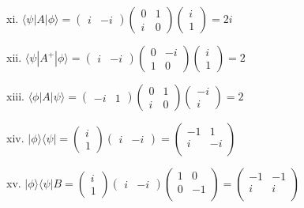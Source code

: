 \documentclass[12pt]{article}
\begin{document}
\begin{spacing}{2.0}
xi. $\langle \psi|A|\phi \rangle= \left(
\begin{array}{cc}
i & -i
\end{array}
\right)\left(
\begin{array}{cc}
0 & 1\\
i & 0
\end{array}
\right)\left(
\begin{array}{c}
i\\
1
\end{array}
\right)=2i$

xii. $\langle \psi|A^{+}|\phi \rangle=\left(
\begin{array}{cc}
i & -i
\end{array}
\right)\left(
\begin{array}{cc}
0 & -i\\
1 & 0
\end{array}
\right)\left(
\begin{array}{c}
i\\
1
\end{array}
\right)=2$

xiii. $\langle \phi|A|\psi \rangle=\left(
\begin{array}{cc}
-i & 1
\end{array}
\right)\left(
\begin{array}{cc}
0 & 1\\
i & 0
\end{array}
\right)\left(
\begin{array}{c}
-i\\
i
\end{array}
\right)=2$

xiv. $|\phi\rangle \langle \psi|= \left(
\begin{array}{c}
i\\
1
\end{array}
\right)\left(
\begin{array}{cc}
i & -i
\end{array}
\right)=\left(
\begin{array}{cc}
 -1 & 1 \\
 i & -i \\
\end{array}
\right)$

xv. $|\phi\rangle \langle \psi|B=\left(
\begin{array}{c}
i\\
1
\end{array}
\right)\left(
\begin{array}{cc}
i & -i
\end{array}
\right)\left(
\begin{array}{cc}
 1 & 0 \\
 0 & -1 \\
\end{array}
\right)= \left(
\begin{array}{cc}
 -1 & -1 \\
 i & i \\
\end{array}
\right)$


\end{spacing}
\end{document}

